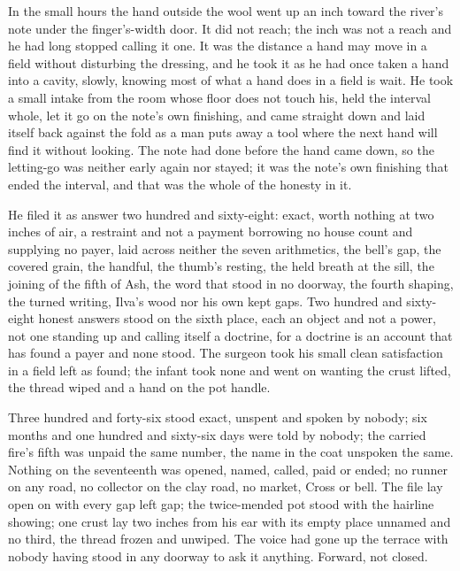 \scenebreak

In the small hours the hand outside the wool went up an inch toward the river's note under the finger's-width door. It did not reach; the inch was not a reach and he had long stopped calling it one. It was the distance a hand may move in a field without disturbing the dressing, and he took it as he had once taken a hand into a cavity, slowly, knowing most of what a hand does in a field is wait. He took a small intake from the room whose floor does not touch his, held the interval whole, let it go on the note's own finishing, and came straight down and laid itself back against the fold as a man puts away a tool where the next hand will find it without looking. The note had done before the hand came down, so the letting-go was neither early again nor stayed; it was the note's own finishing that ended the interval, and that was the whole of the honesty in it.

He filed it as answer two hundred and sixty-eight: exact, worth nothing at two inches of air, a restraint and not a payment borrowing no house count and supplying no payer, laid across neither the seven arithmetics, the bell's gap, the covered grain, the handful, the thumb's resting, the held breath at the sill, the joining of the fifth of Ash, the word that stood in no doorway, the fourth shaping, the turned writing, Ilva's wood nor his own kept gaps. Two hundred and sixty-eight honest answers stood on the sixth place, each an object and not a power, not one standing up and calling itself a doctrine, for a doctrine is an account that has found a payer and none stood. The surgeon took his small clean satisfaction in a field left as found; the infant took none and went on wanting the crust lifted, the thread wiped and a hand on the pot handle.

Three hundred and forty-six stood exact, unspent and spoken by nobody; six months and one hundred and sixty-six days were told by nobody; the carried fire's fifth was unpaid the same number, the name in the coat unspoken the same. Nothing on the seventeenth was opened, named, called, paid or ended; no runner on any road, no collector on the clay road, no market, Cross or bell. The file lay open on  with every gap left gap; the twice-mended pot stood with the hairline showing; one crust lay two inches from his ear with its empty place unnamed and no third, the thread frozen and unwiped. The voice had gone up the terrace with nobody having stood in any doorway to ask it anything. Forward, not closed.

